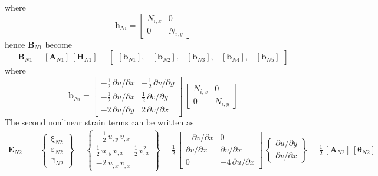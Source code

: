 where 
\begin{equation}
\mathbf{h}_{Ni} = \begin{bmatrix}
N_{i,x} &  0  \\
0 & N_{i,y}  \end{bmatrix} 
\end{equation}
hence $\mathbf{B}_{N1}$ become
\begin{equation}
\mathbf{B}_{N1} = [\mathbf{A}_{N1}] \, [\mathbf{H}_{N1}] = \begin{bmatrix}
 [\mathbf{b}_{N1}], & [\mathbf{b}_{N2}], & [\mathbf{b}_{N3}], & [\mathbf{b}_{N4}], & [\mathbf{b}_{N5}] 
\end{bmatrix} 
\end{equation}
where
\begin{equation}
\mathbf{b}_{Ni} = \begin{bmatrix}
-\tfrac{1}{2} \, \partial u / \partial x &  - \tfrac{1}{2} \, \partial v / \partial y \\
-\tfrac{1}{2} \, \partial u / \partial x &  \tfrac{1}{2} \, \partial v / \partial y \\
-2 \, \partial u / \partial y  & 2 \, \partial v / \partial x  \end{bmatrix}  \, \begin{bmatrix}
N_{i,x} &  0  \\
0 & N_{i,y}  \end{bmatrix} 
\end{equation}
The second nonlinear strain terms can be written as 
\begin{equation}
\begin{aligned}
\mathbf{E}_{N2} & =  \begin{Bmatrix}
\mathrm \xi_{N2} \\
\mathrm \varepsilon_{N2} \\
\mathrm \gamma_{N2} \end{Bmatrix} =
 \begin{Bmatrix}
-\tfrac{1}{2} \, u_{,y} \, v_{,x}  \\
\tfrac{1}{2} \, u_{,y} \, v_{,x}  + \tfrac{1}{2} \, v_{,x}^2 \\
-2 \, u_{,x} \, v_{,x} \end{Bmatrix} = \frac{1}{2} \, \begin{bmatrix}
- \partial v / \partial x &  0 \\
 \partial v / \partial x &  \partial v / \partial x \\
0 & -4 \, \partial u / \partial x  \end{bmatrix} \, \begin{Bmatrix}
\partial u / \partial y\\
\partial v / \partial x
\end{Bmatrix}
= \tfrac{1}{2} \, [\mathbf{A}_{N2}] \, [\boldsymbol{\theta}_{N2}]
\end{aligned}
\end{equation}
